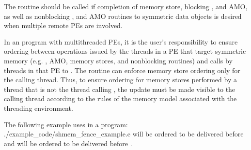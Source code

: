 \begin{apidefinition}
{    The  routine should be called if completion of memory
    store, blocking \PUT{}, and \ac{AMO}, as well as nonblocking \PUT{}, and 
    \ac{AMO} routines to symmetric data objects is desired
    when multiple remote \acp{PE} are involved.

    In an \openshmem program with multithreaded \acp{PE}, it is the
    user's responsibility to ensure ordering between operations issued by the threads
    in a \ac{PE} that target symmetric memory (e.g. \PUT{}, \ac{AMO}, memory stores,
    and nonblocking routines) and calls by threads in that \ac{PE} to
    . The  routine can enforce memory store ordering only for the
    calling thread. Thus, to ensure ordering for memory stores performed by a thread that is
    not the thread calling , the update must be made visible to the
    calling thread according to the rules of the memory model associated with
    the threading environment.
}

\begin{apiexamples}

\apicexample
    {The following example uses  in a \Cstd[11] program: }
    {./example_code/shmem_fence_example.c}
    { will be ordered to be delivered before  and 
    will be ordered to be delivered before .}

\end{apiexamples}

\end{apidefinition}
